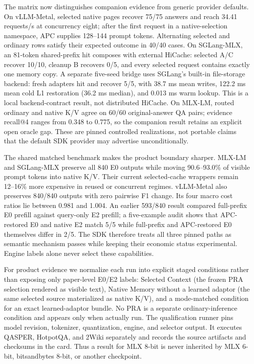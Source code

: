 \documentclass[11pt]{article}
\begin{document}
The matrix now distinguishes companion evidence from generic provider defaults.
On vLLM-Metal, selected native pages recover 75/75 answers and reach 34.41
requests/s at concurrency eight; after the first request in a native-selection
namespace, APC supplies 128--144 prompt tokens. Alternating
selected and ordinary rows satisfy their expected outcome in 40/40 cases. On
SGLang-MLX, an 81-token shared-prefix hit composes with external HiCache:
selected A/C recover 10/10, cleanup B recovers 0/5, and every selected request
contains exactly one memory copy. A separate five-seed bridge uses SGLang's
built-in file-storage backend: fresh adapters hit and recover 5/5, with 38.7 ms
mean writes, 122.2 ms mean cold L1 restoration (36.2 ms median), and 0.013 ms
warm lookup. This is a local backend-contract result, not distributed HiCache.
On MLX-LM, routed ordinary and native K/V
agree on 60/60 original-answer QA pairs; evidence recall@4 ranges from 0.348 to
0.775, so the companion result retains an explicit open oracle gap. These are
pinned controlled realizations,
not portable claims that the default SDK provider may advertise unconditionally.

The shared matched benchmark makes the product boundary sharper. MLX-LM and
SGLang-MLX preserve all 840 E0 outputs while moving 90.6--93.0\% of visible
prompt tokens into native K/V. Their current selected-cache wrappers remain
12--16\% more expensive in reused or concurrent regimes. vLLM-Metal also
preserves 840/840 outputs with zero pairwise F1 change. Its four macro cost
ratios lie between 0.981 and 1.004. An earlier 593/840 result compared
full-prefix E0 prefill against query-only E2 prefill; a five-example audit shows
that APC-restored E0 and native E2 match 5/5 while full-prefix and APC-restored
E0 themselves differ in 2/5. The SDK therefore treats all three pinned paths
as semantic mechanism passes while keeping their economic status experimental.
Engine labels alone never select these capabilities.

For product evidence we normalize each run into explicit staged conditions
rather than exposing only paper-level E0/E2 labels: Selected Context (the
frozen PRA selection rendered as visible text), Native Memory without a learned
adaptor (the same selected source materialized as native K/V), and a
mode-matched condition for an exact learned-adaptor bundle.  No PRA is a
separate ordinary-inference condition and appears only when actually run.  The
qualification runner pins model revision, tokenizer, quantization, engine, and
selector output. It executes QASPER, HotpotQA, and 2Wiki separately and records
the source artifacts and checksums in the card. Thus a result for MLX 8-bit is
never inherited by MLX 6-bit, bitsandbytes 8-bit, or another checkpoint.
\end{document}
